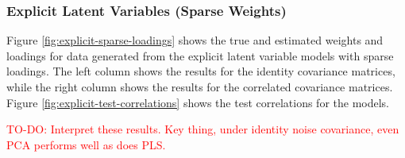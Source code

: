 
\subsubsection{Explicit Latent Variables (Sparse Weights)}

Figure \ref{fig:explicit-sparse-loadings} shows the true and estimated weights and \gls{loadings} for data generated from the explicit latent variable models with sparse \gls{loadings}.
The left column shows the results for the identity covariance matrices, while the right column shows the results for the correlated covariance matrices.
Figure \ref{fig:explicit-test-correlations} shows the test correlations for the models.

\textcolor{red}{TO-DO: Interpret these results. Key thing, under identity noise covariance, even PCA performs well as does PLS. }


